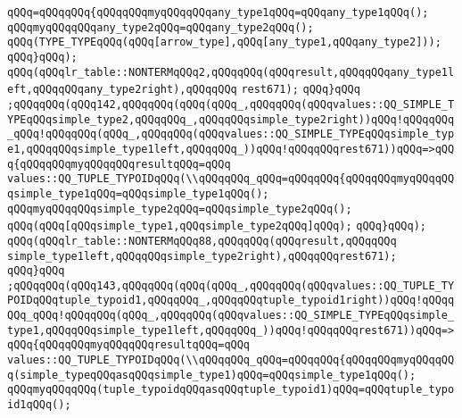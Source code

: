 \verb|qQQq=qQQqqQQq{qQQqqQQqmyqQQqqQQqany_type1qQQq=qQQqany_type1qQQq();|\newline
\verb|qQQqmyqQQqqQQqany_type2qQQq=qQQqany_type2qQQq();|\newline
\verb|qQQq(TYPE_TYPEqQQq(qQQq[arrow_type],qQQq[any_type1,qQQqany_type2]));|\newline
\verb|qQQq}qQQq);|\newline
\verb|qQQq(qQQqlr_table::NONTERMqQQq2,qQQqqQQq(qQQqresult,qQQqqQQqany_type1left,qQQqqQQqany_type2right),qQQqqQQq|\newline
\verb|rest671);|\newline
\verb|qQQq}qQQq|\newline
\verb|;qQQqqQQq(qQQq142,qQQqqQQq(qQQq(qQQq_,qQQqqQQq(qQQqvalues::QQ_SIMPLE_TYPEqQQqsimple_type2,qQQqqQQq_,qQQqqQQqsimple_type2right))qQQq!qQQqqQQq_qQQq!qQQqqQQq(qQQq_,qQQqqQQq(qQQqvalues::QQ_SIMPLE_TYPEqQQqsimple_type1,qQQqqQQqsimple_type1left,qQQqqQQq_))qQQq!qQQqqQQqrest671))qQQq=>qQQq{qQQqqQQqmyqQQqqQQqresultqQQq=qQQq|\newline
\verb|values::QQ_TUPLE_TYPOIDqQQq(\\qQQqqQQq_qQQq=qQQqqQQq{qQQqqQQqmyqQQqqQQqsimple_type1qQQq=qQQqsimple_type1qQQq();|\newline
\verb|qQQqmyqQQqqQQqsimple_type2qQQq=qQQqsimple_type2qQQq();|\newline
\verb|qQQq(qQQq[qQQqsimple_type1,qQQqsimple_type2qQQq]qQQq);|\newline
\verb|qQQq}qQQq);|\newline
\verb|qQQq(qQQqlr_table::NONTERMqQQq88,qQQqqQQq(qQQqresult,qQQqqQQq|\newline
\verb|simple_type1left,qQQqqQQqsimple_type2right),qQQqqQQqrest671);|\newline
\verb|qQQq}qQQq|\newline
\verb|;qQQqqQQq(qQQq143,qQQqqQQq(qQQq(qQQq_,qQQqqQQq(qQQqvalues::QQ_TUPLE_TYPOIDqQQqtuple_typoid1,qQQqqQQq_,qQQqqQQqtuple_typoid1right))qQQq!qQQqqQQq_qQQq!qQQqqQQq(qQQq_,qQQqqQQq(qQQqvalues::QQ_SIMPLE_TYPEqQQqsimple_type1,qQQqqQQqsimple_type1left,qQQqqQQq_))qQQq!qQQqqQQqrest671))qQQq=>qQQq{qQQqqQQqmyqQQqqQQqresultqQQq=qQQq|\newline
\verb|values::QQ_TUPLE_TYPOIDqQQq(\\qQQqqQQq_qQQq=qQQqqQQq{qQQqqQQqmyqQQqqQQq(simple_typeqQQqasqQQqsimple_type1)qQQq=qQQqsimple_type1qQQq();|\newline
\verb|qQQqmyqQQqqQQq(tuple_typoidqQQqasqQQqtuple_typoid1)qQQq=qQQqtuple_typoid1qQQq();|\newline
